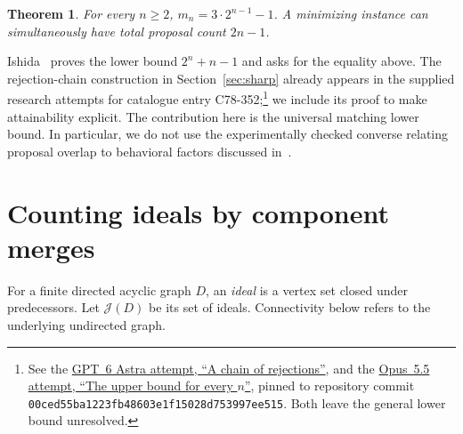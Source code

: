 \documentclass[11pt]{article}
\newtheorem{theorem}{Theorem}
\newcommand{\Id}{\mathcal J}
\begin{document}
\begin{theorem}\label{thm:main}
For every $n\ge2$, $m_n=3\cdot2^{n-1}-1$. A minimizing instance can
simultaneously have total proposal count $2n-1$.
\end{theorem}

Ishida~\cite[Proposition~21.4 and Section~7(A)]{ishida} proves the lower
bound $2^n+n-1$ and asks for the equality above. The rejection-chain
construction in Section~\ref{sec:sharp} already appears in the supplied
research attempts for catalogue entry C78-352;\footnote{See the
\href{https://github.com/mehmetmars7/Erdosproblems-llm-hunter/blob/00ced55ba1223fb48603e1f15028d753997ee515/attacks/open_problems/economics/gpt_6_astra_ultra/C78-352.tex}{GPT~6 Astra attempt, ``A chain of rejections''}, and the
\href{https://github.com/mehmetmars7/Erdosproblems-llm-hunter/blob/00ced55ba1223fb48603e1f15028d753997ee515/attacks/open_problems/economics/opus_5.5_high/C78-352.tex}{Opus~5.5 attempt, ``The upper bound for every $n$''}, pinned to repository commit \texttt{00ced55ba1223fb48603e1f15028d753997ee515}.
Both leave the general lower bound unresolved.}
we include its proof to
make attainability explicit. The contribution here is the universal
matching lower bound. In particular, we do not use the experimentally
checked converse relating proposal overlap to behavioral factors
discussed in~\cite[Sections~2 and~4]{ishida}.

\section{Counting ideals by component merges}

For a finite directed acyclic graph $D$, an \emph{ideal} is a vertex set
closed under predecessors. Let $\Id(D)$ be its set of ideals. Connectivity
below refers to the underlying undirected graph.
\end{document}
